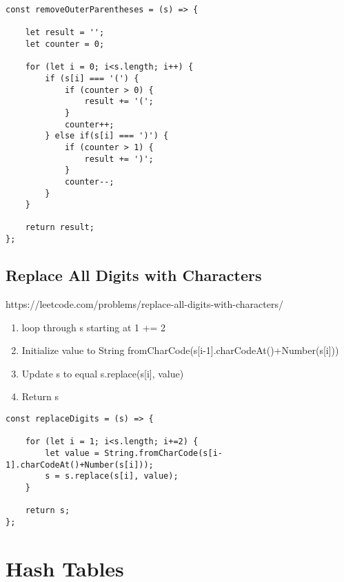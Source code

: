 \documentclass[10pt]{article}
\begin{document}
\begin{lstlisting}[title=Solution removeOuterParentheses, captionpos=t]
const removeOuterParentheses = (s) => {
    
    let result = '';
    let counter = 0;
    
    for (let i = 0; i<s.length; i++) {
        if (s[i] === '(') {
            if (counter > 0) {
                result += '(';
            }
            counter++;
        } else if(s[i] === ')') {
            if (counter > 1) {
                result += ')';
            }
            counter--;
        }
    }
    
    return result;
};
\end{lstlisting}
\medskip %





\pagebreak %
\medskip 
\subsection{Replace All Digits with Characters}
https://leetcode.com/problems/replace-all-digits-with-characters/

\begin{enumerate}
	\item loop through s starting at 1 += 2
	\item Initialize value to String fromCharCode(s[i-1].charCodeAt()+Number(s[i]))
	\item Update s to equal s.replace(s[i], value)
	\item Return s
\end{enumerate}



\begin{lstlisting}[title=Solution replaceDigits, captionpos=t]
const replaceDigits = (s) => {
    
    for (let i = 1; i<s.length; i+=2) {
        let value = String.fromCharCode(s[i-1].charCodeAt()+Number(s[i]));
        s = s.replace(s[i], value);
    }
    
    return s;
};
\end{lstlisting}
\medskip %











\pagebreak
\section{Hash Tables}
\end{document}
